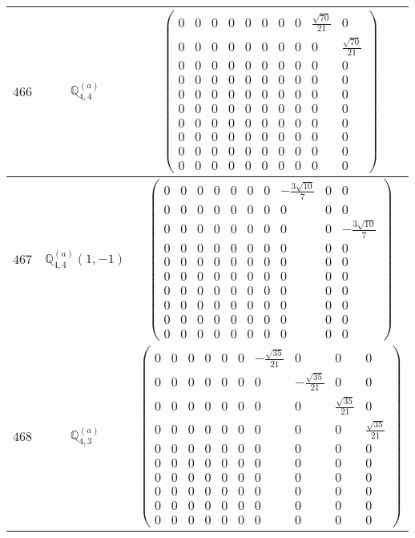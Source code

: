 \documentclass[fleqn,8pt,landscape]{jsarticle}
\begin{document}
\begin{center}
\begin{longtable}{ccc}
$ 466 $ & $ \mathbb{Q}_{4,4}^{(a)} $ & $ \begin{pmatrix} 0 & 0 & 0 & 0 & 0 & 0 & 0 & 0 & \frac{\sqrt{70}}{21} & 0 \\ 0 & 0 & 0 & 0 & 0 & 0 & 0 & 0 & 0 & \frac{\sqrt{70}}{21} \\ 0 & 0 & 0 & 0 & 0 & 0 & 0 & 0 & 0 & 0 \\ 0 & 0 & 0 & 0 & 0 & 0 & 0 & 0 & 0 & 0 \\ 0 & 0 & 0 & 0 & 0 & 0 & 0 & 0 & 0 & 0 \\ 0 & 0 & 0 & 0 & 0 & 0 & 0 & 0 & 0 & 0 \\ 0 & 0 & 0 & 0 & 0 & 0 & 0 & 0 & 0 & 0 \\ 0 & 0 & 0 & 0 & 0 & 0 & 0 & 0 & 0 & 0 \\ 0 & 0 & 0 & 0 & 0 & 0 & 0 & 0 & 0 & 0 \\ 0 & 0 & 0 & 0 & 0 & 0 & 0 & 0 & 0 & 0 \end{pmatrix} $ \\ \hline
$ 467 $ & $ \mathbb{Q}_{4,4}^{(a)}(1,-1) $ & $ \begin{pmatrix} 0 & 0 & 0 & 0 & 0 & 0 & 0 & - \frac{3 \sqrt{10}}{7} & 0 & 0 \\ 0 & 0 & 0 & 0 & 0 & 0 & 0 & 0 & 0 & 0 \\ 0 & 0 & 0 & 0 & 0 & 0 & 0 & 0 & 0 & - \frac{3 \sqrt{10}}{7} \\ 0 & 0 & 0 & 0 & 0 & 0 & 0 & 0 & 0 & 0 \\ 0 & 0 & 0 & 0 & 0 & 0 & 0 & 0 & 0 & 0 \\ 0 & 0 & 0 & 0 & 0 & 0 & 0 & 0 & 0 & 0 \\ 0 & 0 & 0 & 0 & 0 & 0 & 0 & 0 & 0 & 0 \\ 0 & 0 & 0 & 0 & 0 & 0 & 0 & 0 & 0 & 0 \\ 0 & 0 & 0 & 0 & 0 & 0 & 0 & 0 & 0 & 0 \\ 0 & 0 & 0 & 0 & 0 & 0 & 0 & 0 & 0 & 0 \end{pmatrix} $ \\ \hline
$ 468 $ & $ \mathbb{Q}_{4,3}^{(a)} $ & $ \begin{pmatrix} 0 & 0 & 0 & 0 & 0 & 0 & - \frac{\sqrt{35}}{21} & 0 & 0 & 0 \\ 0 & 0 & 0 & 0 & 0 & 0 & 0 & - \frac{\sqrt{35}}{21} & 0 & 0 \\ 0 & 0 & 0 & 0 & 0 & 0 & 0 & 0 & \frac{\sqrt{35}}{21} & 0 \\ 0 & 0 & 0 & 0 & 0 & 0 & 0 & 0 & 0 & \frac{\sqrt{35}}{21} \\ 0 & 0 & 0 & 0 & 0 & 0 & 0 & 0 & 0 & 0 \\ 0 & 0 & 0 & 0 & 0 & 0 & 0 & 0 & 0 & 0 \\ 0 & 0 & 0 & 0 & 0 & 0 & 0 & 0 & 0 & 0 \\ 0 & 0 & 0 & 0 & 0 & 0 & 0 & 0 & 0 & 0 \\ 0 & 0 & 0 & 0 & 0 & 0 & 0 & 0 & 0 & 0 \\ 0 & 0 & 0 & 0 & 0 & 0 & 0 & 0 & 0 & 0 \end{pmatrix} $ \\ \hline

\end{longtable}
\end{center}
\end{document}
